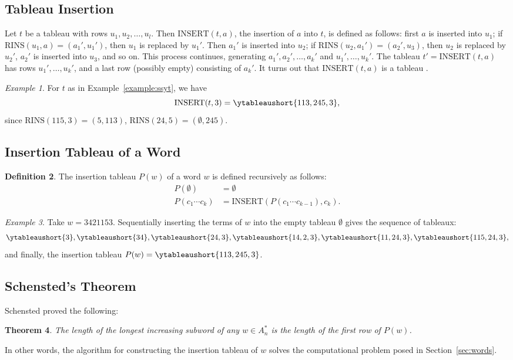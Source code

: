 \documentclass[10pt]{amsproc}
\newtheorem{theorem}{Theorem}[subsection]
\theoremstyle{definition}
\newtheorem{definition}[theorem]{Definition}
\theoremstyle{remark}
\newtheorem{example}[theorem]{Example}
\newcommand{\rowins}{\mathrm{RINS}}
\newcommand{\ins}{\mathrm{INSERT}}
\begin{document}
\subsection{Tableau Insertion}
\label{sec:tableau-insertion}
Let $t$ be a tableau with rows $u_1,u_2,\dotsc, u_l$.
Then $\ins(t,a)$, the insertion of $a$ into $t$, is defined as follows: first $a$ is inserted into $u_1$; if $\rowins(u_1,a)=(a_1',u_1')$, then $u_1$ is replaced by $u_1'$.
Then $a_1'$ is inserted into $u_2$; if $\rowins(u_2,a_1')=(a_2',u_3)$, then $u_2$ is replaced by $u_2'$, $a_2'$ is inserted into $u_3$, and so on.
This process continues, generating $a_1',a_2',\dotsc,a_k'$ and $u_1',\dotsc,u_k'$.
The tableau $t'=\ins(t,a)$ has rows $u_1',\dotsc,u_k'$, and a last row (possibly empty) consisting of $a_k'$.
It turns out that $\ins(t,a)$ is a tableau \cite{knuth}.
\begin{example}
  \label{example:insertion}
  For $t$ as in Example~\ref{example:ssyt}, we have
  \begin{displaymath}
    \ins(t,3) = \ytableaushort{113,245,3},
  \end{displaymath}
  since $\rowins(115,3)=(5,113)$, $\rowins(24,5)=(\emptyset,245)$.
\end{example}
\subsection{Insertion Tableau of a Word}
\label{sec:insert-tabl-word}
\begin{definition}
\label{definition:insertion-tableau}
The insertion tableau $P(w)$ of a word $w$ is defined recursively as follows:
\begin{align}
  P(\emptyset)&=\emptyset\\
  P(c_1\dotsb c_k)&=\ins(P(c_1\dotsb c_{k-1}), c_k).
\end{align}
\end{definition}
\begin{example}
  \label{example:insertion-tableau}
  Take $w=3421153$.
  Sequentially inserting the terms of $w$ into the empty tableau $\emptyset$ gives the sequence of tableaux:
  \begin{displaymath}
    \ytableaushort{3},\ytableaushort{34},\ytableaushort{24,3},\ytableaushort{14,2,3},\ytableaushort{11,24,3},\ytableaushort{115,24,3},
  \end{displaymath}
  and finally, the insertion tableau $P(w)=\ytableaushort{113,245,3}$.
\end{example}
\subsection{Schensted's Theorem}
\label{sec:schensted-theorem}
Schensted \cite{schensted} proved the following:
\begin{theorem}
  The length of the longest increasing subword of any $w\in A_n^*$ is the length of the first row of $P(w)$.
\end{theorem}
In other words, the algorithm for constructing the insertion tableau of $w$ solves the computational problem posed in Section~\ref{sec:words}.
\end{document}
